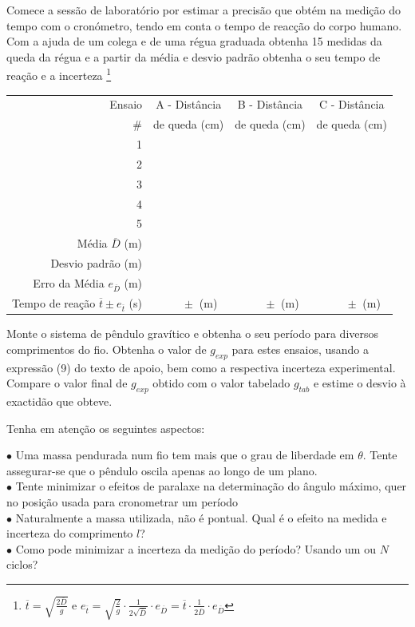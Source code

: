\documentclass[a4paper,12pt]{article}      %
\begin{document}
Comece a sessão de laboratório por estimar a precisão que obtém na medição do tempo com o cronómetro, tendo em conta 
o tempo de reacção do corpo humano. 
Com a ajuda de um colega e de uma régua graduada obtenha 15 medidas da queda da régua e a partir da média e desvio padrão obtenha o seu tempo de reação e a incerteza \footnote{$\overline{t}=\sqrt{\frac{2 \overline{D}}{g}}$ e   
$e_{\overline{t}}=\sqrt{\frac{2 }{g}} \cdot \frac{1}{2\sqrt{\overline{D}}} \cdot e_{\overline{D}}  
= \overline{t} \cdot \frac{1}{2\overline{D}} \cdot e_{\overline{D}} $ }

\begin{tabular}{|r|c|c|c|}
\hline
Ensaio  & A - Distância & B - Distância & C - Distância  \\
\# & de queda (cm) & de queda (cm) & de queda (cm)\\
\hline \hline
1 & & & \\
\hline
2 & &  &\\
\hline 3 & & & \\
\hline 4 & & & \\
\hline 5 & & & \\
\hline \hline
Média $\overline{D}$ (m) & &  & \\
Desvio padrão (m) & & & \\
Erro da Média  $e_{\overline{D}}$ (m) & & & \\ 
Tempo de reação $\overline{t} \pm e_{\overline{t}}$ (s) & $\qquad \pm$ \quad(m) & $\qquad \pm$ \quad (m) & $\qquad \pm$ \quad (m) \\
\hline
\end{tabular}

Monte o sistema de pêndulo gravítico e obtenha o seu período para diversos comprimentos do fio. 
Obtenha o valor de $g_{exp}$ para estes ensaios, usando a expressão (9) do texto de apoio, bem como a respectiva incerteza experimental. 
Compare o valor final de $g_{exp}$ obtido com o valor tabelado $g_{tab}$ e estime o desvio à exactidão que obteve. 

\smallskip

Tenha em atenção os seguintes aspectos:
 \begin{flushleft}
	 $\bullet$ Uma massa pendurada num fio tem mais que o grau de liberdade em $\theta$. Tente assegurar-se que o pêndulo oscila apenas ao longo de um plano. \\
	 $\bullet$ Tente minimizar o efeitos de paralaxe na determinação do ângulo máximo, quer no posição usada para cronometrar um período  \\
	 $\bullet$ Naturalmente a massa utilizada, não é pontual. Qual é o efeito  na medida e incerteza do comprimento $l$? \\	
	 $\bullet$ Como pode minimizar a incerteza da medição do período? Usando um ou $N$ ciclos? \\
\end{flushleft} 
\end{document}

